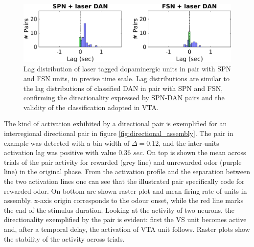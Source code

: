 \begin{figure}[H]
\centering
\includegraphics[scale=0.5]{figures/LagSecLaser3VS.png}
\caption{Lag distribution of laser tagged dopaminergic units in pair with SPN and FSN units, in precise time scale. Lag distributions are similar to the lag distributions of classified DAN in pair with SPN and FSN, confirming the directionality expressed by SPN-DAN pairs and the validity of the classification adopted in VTA.}
\label{fig:LagInSecLaser}
\end{figure}
The kind of activation exhibited by a directional pair is exemplified for an interregional directional pair in figure \ref{fig:directional_assembly}. The pair in example was detected with a bin width of $\Delta = 0.12$, and the inter-units activation lag was positive with value 0.36 $sec$. On top is shown the mean across trials of the pair activity for rewarded (grey line) and unrewarded odor (purple line) in the original phase. From the activation profile and the separation between the two activation lines one can see that the illustrated pair specifically code for rewarded odor. On bottom are shown raster plot and mean firing rate of units in assembly. x-axis origin corresponds to the odour onset, while the red line marks the end of the stimulus duration.
Looking at the activity of two neurons, the directionality exemplified by the pair is evident: first the VS unit becomes active and, after a temporal delay, the activation of VTA unit follows. Raster plots show the stability of the activity across trials.\\ 
